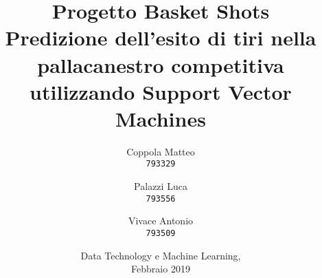 \documentclass[12pt,a4paper]{report}
\begin{document}
\title{%
  \Huge Progetto Basket Shots\\
  \large Predizione dell'esito di tiri nella pallacanestro competitiva utilizzando Support Vector Machines\\
    }
\author{
  Coppola Matteo\\
  \texttt{793329}
  \and
  Palazzi Luca\\
  \texttt{793556}
   \and
  Vivace Antonio\\
  \texttt{793509}
}
\date{Data Technology e Machine Learning, \\ Febbraio 2019}
\maketitle

\tableofcontents





\end{document}
